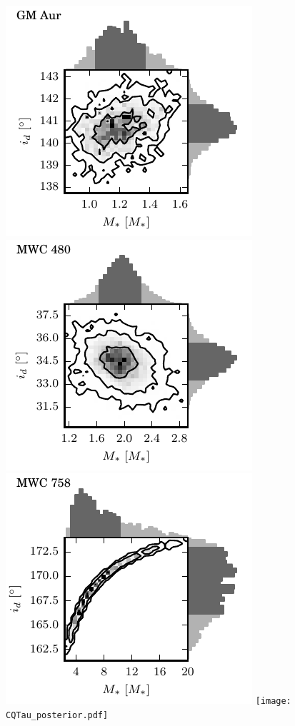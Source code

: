 \documentclass{aastex6}
\begin{document}
\begin{figure}[htb]
\begin{center}
\includegraphics{GMAur_posterior.pdf}
\includegraphics{MWC480_posterior.pdf}
\includegraphics{MWC758_posterior.pdf}
\texttt{[image: CQTau\_posterior.pdf]}
\end{center}
\end{figure}
\end{document}

